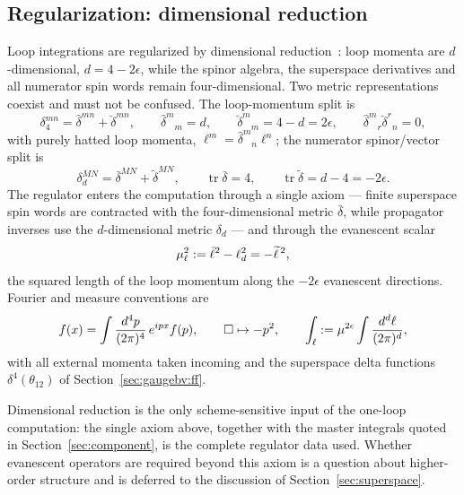 \subsection{Regularization: dimensional reduction}\label{sec:gaugebv:dred}

Loop integrations are regularized by dimensional reduction~\cite{SiegelDRED}: loop momenta are $d$-dimensional, $d=4-2\epsilon$, while the spinor algebra, the superspace derivatives and all numerator spin words remain four-dimensional. Two metric representations coexist and must not be confused. The loop-momentum split is
\begin{equation}\label{eq:gaugebv:dredloop}
\delta_4^{mn}=\widehat\delta^{mn}+\breve\delta^{mn},\qquad
\widehat\delta^m{}_m=d,\qquad
\breve\delta^m{}_m=4-d=2\epsilon,\qquad
\widehat\delta^m{}_r\breve\delta^r{}_n=0,
\end{equation}
with purely hatted loop momenta, $\ell^m=\widehat\delta^m{}_n\ell^n$; the numerator spinor/vector split is
\begin{equation}\label{eq:gaugebv:dredspin}
\delta_d^{MN}=\bar\delta^{MN}+\widetilde\delta^{MN},\qquad
\operatorname{tr}\bar\delta=4,\qquad
\operatorname{tr}\widetilde\delta=d-4=-2\epsilon.
\end{equation}
The regulator enters the computation through a single axiom --- finite superspace spin words are contracted with the four-dimensional metric $\bar\delta$, while propagator inverses use the $d$-dimensional metric $\delta_d$ --- and through the evanescent scalar
\begin{equation}\label{eq:gaugebv:mul}
\mu_\ell^2:=\bar\ell^2-\ell_d^2=-\widetilde\ell^{\,2},
\end{equation}
the squared length of the loop momentum along the $-2\epsilon$ evanescent directions. Fourier and measure conventions are
\begin{equation}\label{eq:gaugebv:measure}
f(x)=\int\frac{d^4p}{(2\pi)^4}\,e^{ipx}f(p),\qquad
\Box\mapsto-p^2,\qquad
\int_\ell:=\mu^{2\epsilon}\int\frac{d^d\ell}{(2\pi)^d},
\end{equation}
with all external momenta taken incoming and the superspace delta functions $\delta^4(\theta_{12})$ of Section~\ref{sec:gaugebv:ff}.

\begin{remark}\label{rem:gaugebv:dredstatus}
Dimensional reduction is the only scheme-sensitive input of the one-loop computation: the single axiom above, together with the master integrals quoted in Section~\ref{sec:component}, is the complete regulator data used. Whether evanescent operators are required beyond this axiom is a question about higher-order structure and is deferred to the discussion of Section~\ref{sec:superspace}.
\end{remark}
